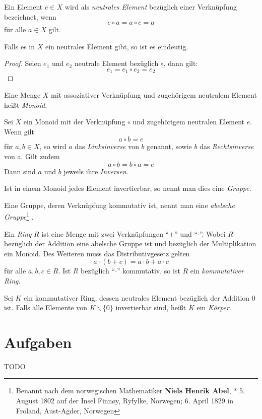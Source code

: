 \begin{definition}
Ein Element $e\in X$ wird als \emph{neutrales Element} bezüglich einer Verknüpfung bezeichnet, wenn 
\[ e\circ a = a \circ e = a \]
für alle $a\in X$ gilt.
\end{definition}

\begin{claim}
Falls es in $X$ ein neutrales Element gibt, so ist es eindeutig. 
\end{claim}
\begin{proof}
Seien $e_1$ und $e_2$ neutrale Element bezüglich $\circ$, dann gilt: 
\[ e_1 = e_1\circ e_2 = e_2 \]
\end{proof}

\begin{definition}
Eine Menge $X$ mit assoziativer Verknüpfung und zugehörigem neutralem Element heißt \emph{Monoid}.
\end{definition}

\begin{definition}
Sei $X$ ein Monoid mit der Verknüpfung $\circ$ und zugehörigem neutralen Element $e$. Wenn gilt
\[ a\circ b = e \]
für $a,b \in X$, so wird $a$ das \emph{Linksinverse} von $b$ genannt, sowie $b$ das \emph{Rechtsinverse} von a. Gilt zudem
\[ a\circ b = b \circ a = e \]
Dann sind $a$ und $b$ jeweils ihre \emph{Inversen}. 
\end{definition}

\begin{definition}
Ist in einem Monoid jedes Element invertierbar, so nennt man dies eine \emph{Gruppe}.
\end{definition}

\begin{definition}
Eine Gruppe, deren Verknüpfung kommutativ ist, nennt man eine \emph{abelsche Gruppe}\footnote{Benannt nach dem norwegischen Mathematiker \textbf{Niels Henrik Abel}, * 5. August 1802 auf der Insel Finn\o y, Ryfylke, Norwegen;  6. April 1829 in Froland, Aust-Agder, Norwegen} .
\end{definition}

\begin{definition}
Ein \emph{Ring} $R$ ist eine Menge mit zwei Verknüpfungen "`$+$"' und "`$\cdot$"'. Wobei $R$ bezüglich der Addition eine abelsche Gruppe ist und bezüglich der Multiplikation ein Monoid. Des Weiteren muss das Distributivgesetz gelten
\[ a\cdot (b+c) = a\cdot b + a\cdot c \]
für alle $a,b,c \in R$. Ist $R$ bezüglich "`$\cdot$"' kommutativ, so ist $R$ ein \emph{kommutativer Ring}.
\end{definition}

\begin{definition}
Sei $K$ ein kommutativer Ring, dessen neutrales Element bezüglich der Addition $0$ ist. Falls alle Elemente von $K\backslash \{0\}$ invertierbar sind, heißt $K$ ein \emph{Körper}.
\end{definition}

\section{Aufgaben}

TODO

